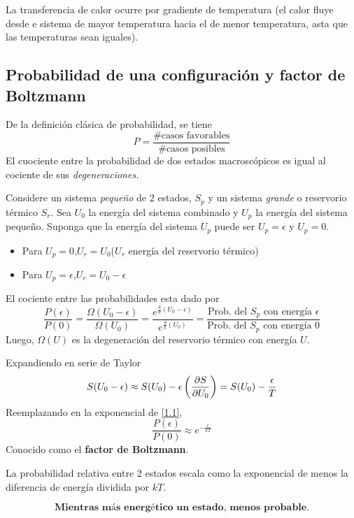 \begin{cor}
	La transferencia de calor ocurre por gradiente de temperatura (el calor fluye desde e sistema de mayor temperatura hacia el de menor temperatura, asta que las temperaturas sean iguales).
\end{cor}

\subsection{Probabilidad de una configuración y factor de Boltzmann}
De la definición clásica de probabilidad, se tiene
\begin{equation}
  P=\frac{\# \text{casos favorables}}{\# \text{casos posibles}}
\end{equation}
El cuociente entre la probabilidad de dos estados macroscópicos es igual al cociente de sus \textit{degeneraciones.}

Considere un sistema \textit{pequeño} de 2 estados, $S_p$ y un sistema \textit{grande} o reservorio térmico $S_r$. Sea $U_0$ la energía del sistema combinado y $U_p$ la energía del sistema pequeño. Suponga que la energía del sistema $U_p$ puede ser $U_p=\epsilon$ y $U_p=0$.
\begin{itemize}
	\item Para $U_p=0$,\quad $U_r=U_0$\quad ($U_r$ energía del reservorio térmico)
	\item Para $U_p=\epsilon$,\quad $U_r=U_0-\epsilon$
\end{itemize}
El cociente entre las probabilidades esta dado por
\begin{equation}\label{1.1}
  \frac{P(\epsilon)}{P(0)}=\frac{\Omega(U_0-\epsilon)}{\Omega(U_0)}=\frac{e^{\frac{S}{k}(U_0-\epsilon)}}{e^{\frac{S}{k}(U_0)}}=\frac{\text{Prob. del $S_p$ con energía $\epsilon$}}{\text{Prob. del $S_p$ con energía $0$}}
\end{equation}
Luego, $\Omega(U)$ es la degeneración del reservorio térmico con energía $U$.

Expandiendo en serie de Taylor 
\begin{equation}
  S(U_0-\epsilon)\approx S(U_0)-\epsilon\left(\pdv{S}{U_0}\right)=S(U_0)-\frac{\epsilon}{T}
\end{equation}
Reemplazando en la exponencial de \eqref{1.1},
\begin{equation}
  \boxed{\frac{P(\epsilon)}{P(0)}\approx e^{-\frac{\epsilon}{kT}}}
\end{equation}
Conocido como el \textbf{factor de Boltzmann}.

La probabilidad relativa entre 2 estados escala como la exponencial de menos la diferencia de energía dividida por $kT$.

\begin{equation}
  	\textbf{Mientras más energético un estado, menos probable.}
\end{equation}
































